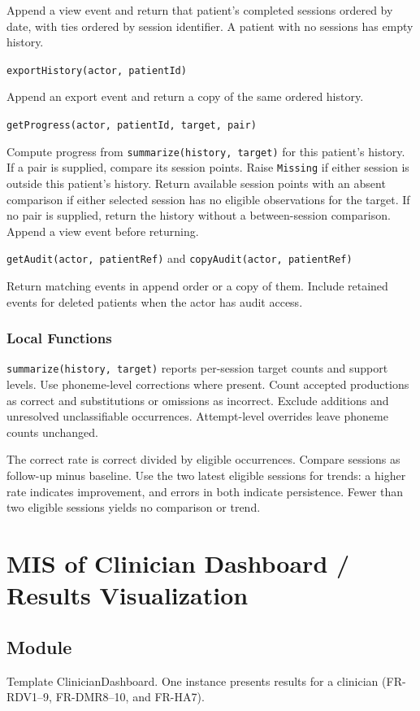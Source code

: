 \documentclass[12pt, titlepage]{article}
\begin{document}
\begin{description}
Append a view event and return
that patient's completed sessions ordered by date, with ties ordered by
session identifier. A patient with no sessions has empty history.
\item[] \texttt{exportHistory(actor, patientId)}\par
Append an export event and
return a copy of the same ordered history.
\item[] \texttt{getProgress(actor, patientId, target, pair)}\par
Compute progress
from \texttt{summarize(history, target)} for this patient's history. If a
pair is supplied, compare its session points. Raise \texttt{Missing} if
either session is outside this patient's history. Return available session
points with an absent comparison if either selected session has no eligible
observations for the target. If no pair is supplied, return the history
without a between-session comparison. Append a view event before returning.
\item[] \texttt{getAudit(actor, patientRef)} and \texttt{copyAudit(actor, patientRef)}\par
Return matching events in append order or a copy of them. Include retained
events for deleted patients when the actor has audit access.
\end{description}

\subsubsection{Local Functions}
\texttt{summarize(history, target)} reports per-session target counts and
support levels. Use phoneme-level corrections where present. Count accepted
productions as correct and substitutions or omissions as incorrect. Exclude
additions and unresolved unclassifiable occurrences. Attempt-level overrides
leave phoneme counts unchanged.

The correct rate is correct divided by eligible occurrences. Compare sessions
as follow-up minus baseline. Use the two latest eligible sessions for trends:
a higher rate indicates improvement, and errors in both indicate persistence.
Fewer than two eligible sessions yields no comparison or trend.

\clearpage
\section{MIS of Clinician Dashboard / Results Visualization} \label{mis:dashboard}

\subsection{Module}
Template ClinicianDashboard. One instance presents results for a clinician
(FR-RDV1--9, FR-DMR8--10, and FR-HA7).
\end{document}

